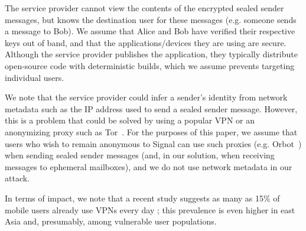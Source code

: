 The service provider cannot view the contents of the encrypted sealed sender
messages, but knows the destination user for these messages (e.g. someone sends
a message to Bob).  We assume that Alice and Bob have verified their respective 
keys out of band,
and that the applications/devices they are using are secure.
Although the service provider publishes the application, they typically
distribute open-source code with deterministic builds, which we assume prevents
targeting individual users.

We note that the service provider could infer a sender's identity from network metadata
such as the IP address used to send a sealed sender message. However, this is a problem
that could be solved by using a popular VPN or an
anonymizing proxy such as Tor~\cite{signal-tor, tor_two}. For the purposes of
this paper, we assume that users who wish to remain anonymous to Signal can use
such proxies (e.g. Orbot~\cite{guardianproject}) when sending sealed sender messages (and, in our solution,
when receiving messages to ephemeral mailboxes), and we do not use network
metadata in our attack.

In terms of impact, we note that a recent study
suggests as many as 15\% of mobile users already use VPNs every day
\cite{vpn-usage};
this prevalence is even higher in east Asia and, presumably, among
vulnerable user populations.

